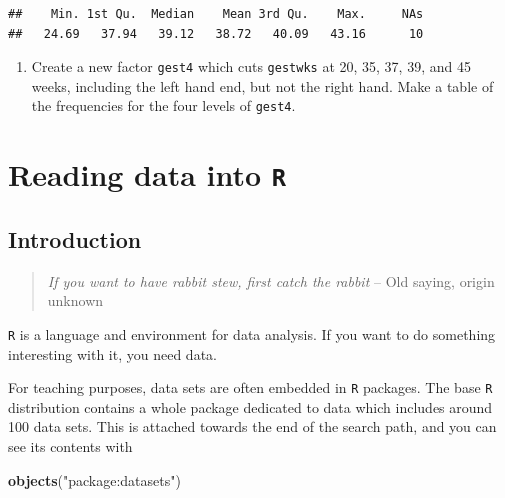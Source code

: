 \documentclass[
]{book}
\newenvironment{Shaded}{\begin{snugshade}}{\end{snugshade}}
\newcommand{\FunctionTok}[1]{\textcolor[rgb]{0.13,0.29,0.53}{\textbf{#1}}}
\newcommand{\NormalTok}[1]{#1}
\newcommand{\StringTok}[1]{\textcolor[rgb]{0.31,0.60,0.02}{#1}}
\providecommand{\tightlist}{%
  \setlength{\itemsep}{0pt}\setlength{\parskip}{0pt}}
\begin{document}
\begin{verbatim}
##    Min. 1st Qu.  Median    Mean 3rd Qu.    Max.     NAs 
##   24.69   37.94   39.12   38.72   40.09   43.16      10
\end{verbatim}

\begin{enumerate}
\def\labelenumi{\arabic{enumi}.}
\setcounter{enumi}{1}
\tightlist
\item
  Create a new factor \texttt{gest4} which cuts \texttt{gestwks} at 20,
  35, 37, 39, and 45 weeks, including the left hand end, but not the
  right hand. Make a table of the frequencies for the four levels of \texttt{gest4}.
\end{enumerate}

\chapter{\texorpdfstring{Reading data into \texttt{R}}{Reading data into R}}\label{reading-data-into-r}

\section{Introduction}\label{introduction}

\begin{quote}
\emph{If you want to have rabbit stew, first catch the rabbit} -- Old saying, origin unknown
\end{quote}

\texttt{R} is a language and environment for data analysis. If you
want to do something interesting with it, you need data.

For teaching purposes, data sets are often embedded in \texttt{R}
packages. The base \texttt{R} distribution contains a whole package
dedicated to data which includes around 100 data sets. This is
attached towards the end of the search path, and you can see its
contents with

\begin{Shaded}
\begin{Highlighting}[]
\FunctionTok{objects}\NormalTok{(}\StringTok{"package:datasets"}\NormalTok{)}
\end{Highlighting}
\end{Shaded}
\end{document}
